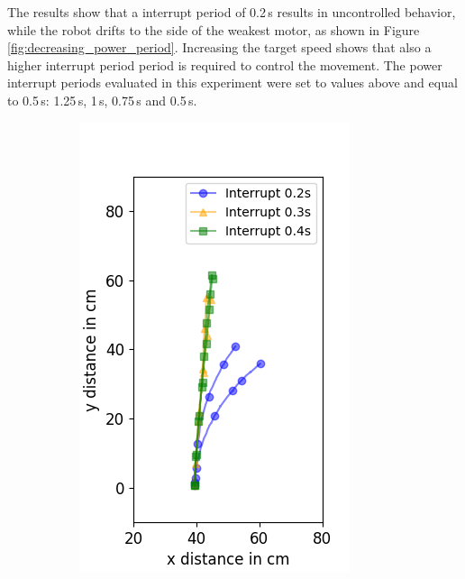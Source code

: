 The results show that a interrupt period of 0.2\,s results in uncontrolled behavior, while the robot drifts to the side of the weakest motor, as shown in Figure \ref{fig:decreasing_power_period}.
Increasing the target speed shows that also a higher interrupt period period is required to control the movement. 
The power interrupt periods evaluated in this experiment were set to values above and equal to 0.5\,s: 1.25\,s, 1\,s, 0.75\,s and 0.5\,s.


\begin{figure}
	\begin{subfigure}[b]{0.32\textwidth}
		\includegraphics[width=\textwidth]{pics/figure_40.png}

\end{subfigure}
\end{figure}
